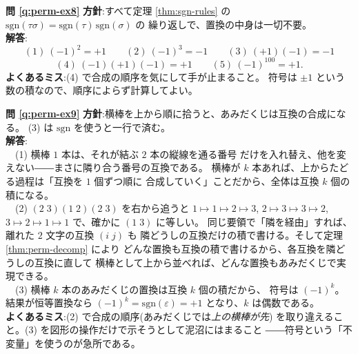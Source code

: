 \bigskip
\noindent\textbf{問 \ref{q:perm-ex8}}\quad
\textbf{方針}:すべて定理 \ref{thm:sgn-rules} の
$\mathrm{sgn}(\tau\sigma) = \mathrm{sgn}(\tau)\,\mathrm{sgn}(\sigma)$ の
繰り返しで、置換の中身は一切不要。\\
\textbf{解答}:
\[
(1)\ (-1)^2 = +1 \qquad
(2)\ (-1)^3 = -1 \qquad
(3)\ (+1)(-1) = -1
\]
\[
(4)\ (-1)(+1)(-1) = +1 \qquad
(5)\ (-1)^{100} = +1.
\]
\textbf{よくあるミス}:(4) で合成の順序を気にして手が止まること。
符号は $\pm 1$ という数の積なので、順序によらず計算してよい。

\bigskip
\noindent\textbf{問 \ref{q:perm-ex9}}\quad
\textbf{方針}:横棒を上から順に拾うと、あみだくじは互換の合成になる。
(3) は $\mathrm{sgn}$ を使うと一行で済む。\\
\textbf{解答}:\\
　(1) 横棒 $1$ 本は、それが結ぶ $2$ 本の縦線を通る番号
だけを入れ替え、他を変えない――まさに隣り合う番号の互換である。
横棒が $k$ 本あれば、上からたどる過程は「互換を $1$ 個ずつ順に
合成していく」ことだから、全体は互換 $k$ 個の積になる。\\
　(2) $(2\;3)(1\;2)(2\;3)$ を右から追うと
$1 \mapsto 1 \mapsto 2 \mapsto 3$,
$2 \mapsto 3 \mapsto 3 \mapsto 2$,
$3 \mapsto 2 \mapsto 1 \mapsto 1$ で、確かに $(1\;3)$ に等しい。
同じ要領で「隣を経由」すれば、離れた $2$ 文字の互換 $(i\;j)$ も
隣どうしの互換だけの積で書ける。そして定理 \ref{thm:perm-decomp} により
どんな置換も互換の積で書けるから、各互換を隣どうしの互換に直して
横棒として上から並べれば、どんな置換もあみだくじで実現できる。\\
　(3) 横棒 $k$ 本のあみだくじの置換は互換 $k$ 個の積だから、
符号は $(-1)^k$。結果が恒等置換なら
$(-1)^k = \mathrm{sgn}(\varepsilon) = +1$ となり、$k$ は偶数である。\\
\textbf{よくあるミス}:(2) で合成の順序(あみだくじでは\emph{上の横棒が先})
を取り違えること。(3) を図形の操作だけで示そうとして泥沼にはまること
――符号という「不変量」を使うのが急所である。

